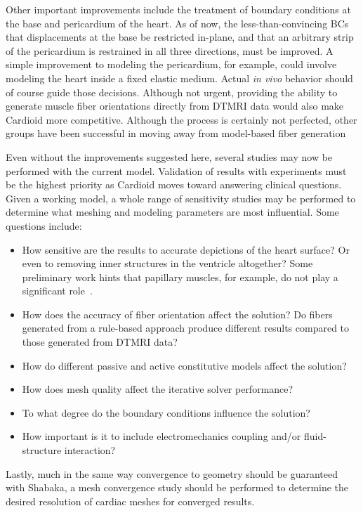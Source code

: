 Other important improvements include the treatment of boundary conditions at the base and pericardium of the heart. As of now, the less-than-convincing BCs that displacements at the base be restricted in-plane, and that an arbitrary strip of the pericardium is restrained in all three directions, must be improved. A simple improvement to modeling the pericardium, for example, could involve modeling the heart inside a fixed elastic medium. Actual \textit{in vivo} behavior should of course guide those decisions. Although not urgent, providing the ability to generate muscle fiber orientations directly from DTMRI data would also make Cardioid more competitive. Although the process is certainly not perfected, other groups have been successful in moving away from model-based fiber generation~\cite{yang_2012, zhukov_2003}

Even without the improvements suggested here, several studies may now be performed with the current model. Validation of results with experiments must be the highest priority as Cardioid moves toward answering clinical questions. Given a working model, a whole range of sensitivity studies may be performed to determine what meshing and modeling parameters are most influential. Some questions include:
\begin{itemize}
\item How sensitive are the results to accurate depictions of the heart surface? Or even to removing inner structures in the ventricle altogether? Some preliminary work hints that papillary muscles, for example, do not play a significant role~\cite{korte_2019}.
\item How does the accuracy of fiber orientation affect the solution? Do fibers generated from a rule-based approach produce different results compared to those generated from DTMRI data?
\item How do different passive and active constitutive models affect the solution?
\item How does mesh quality affect the iterative solver performance?
\item To what degree do the boundary conditions influence the solution?
\item How important is it to include electromechanics coupling and/or fluid-structure interaction?
\end{itemize} 
Lastly, much in the same way convergence to geometry should be guaranteed with Shabaka, a mesh convergence study should be performed to determine the desired resolution of cardiac meshes for converged results.

